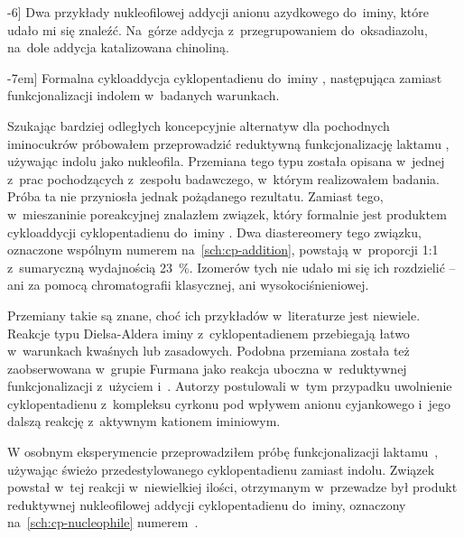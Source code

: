 \begin{scheme*}[t]
  
  \caption[][-6\baselineskip]{
    Dwa przykłady nukleofilowej addycji anionu azydkowego do~iminy, które udało mi się znaleźć.
    Na~górze addycja z~przegrupowaniem do~oksadiazolu, na~dole addycja katalizowana chinoliną.
  }
  \label{sch:azide-nucleophile}
\end{scheme*}

\begin{scheme*}[b]
  
  \caption[][-7em]{
    Formalna cykloaddycja cyklopentadienu do~iminy , następująca zamiast
      funkcjonalizacji indolem w~badanych warunkach.
  }
  \label{sch:cp-addition}
\end{scheme*}

Szukając bardziej odległych koncepcyjnie alternatyw dla  pochodnych
  iminocukrów próbowałem przeprowadzić reduktywną funkcjonalizację laktamu ,
  używając indolu jako nukleofila.
Przemiana tego typu została opisana w~jednej z~prac pochodzących z~zespołu badawczego,
  w~którym realizowałem badania.
Próba ta nie przyniosła jednak pożądanego rezultatu.
Zamiast tego, w~mieszaninie poreakcyjnej znalazłem związek, który formalnie jest produktem
  cykloaddycji cyklopentadienu do~iminy .
Dwa diastereomery tego związku, oznaczone wspólnym numerem 
  na~\cref{sch:cp-addition}, powstają w~proporcji 1:1 z~sumaryczną wydajnością \SI{23}{\percent}.
Izomerów tych nie udało mi się ich rozdzielić \--- ani za pomocą chromatografii klasycznej,
  ani wysokociśnieniowej.

Przemiany takie są znane, choć ich przykładów w~literaturze jest niewiele.
Reakcje typu Dielsa-Aldera iminy z~cyklopentadienem przebiegają łatwo w~warunkach
  kwaśnych lub zasadowych.
Podobna przemiana została też zaobserwowana w~grupie Furmana jako reakcja uboczna w~reduktywnej
  funkcjonalizacji  z~użyciem \schwartz{} i~.
Autorzy postulowali w~tym przypadku uwolnienie cyklopentadienu z~kompleksu cyrkonu pod wpływem anionu cyjankowego i~jego dalszą reakcję z~aktywnym kationem
  iminiowym.

W osobnym eksperymencie przeprowadziłem próbę funkcjonalizacji laktamu~,
  używając świeżo przedestylowanego cyklopentadienu zamiast indolu.
Związek~ powstał w~tej reakcji w~niewielkiej ilości, otrzymanym
  w~przewadze był produkt reduktywnej nukleofilowej addycji cyklopentadienu do~iminy,
  oznaczony na~\cref{sch:cp-nucleophile} numerem~.

